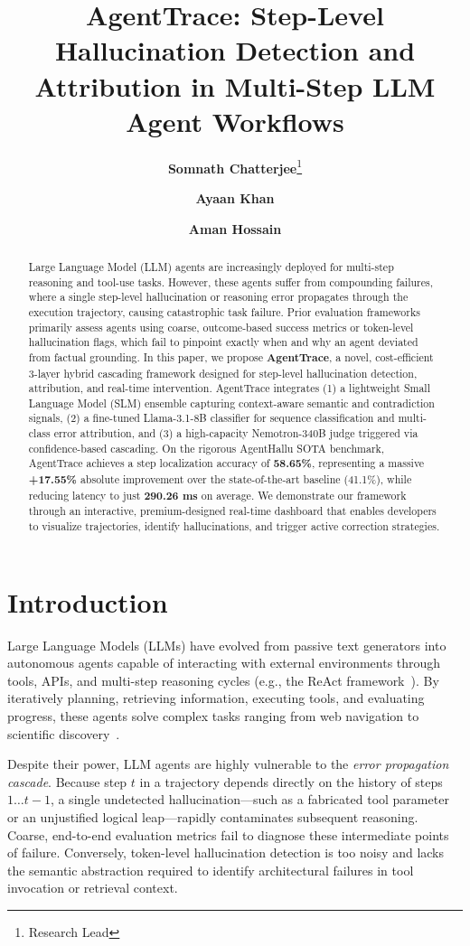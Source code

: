 \documentclass[11pt,a4paper]{article}
\title{\textbf{AgentTrace: Step-Level Hallucination Detection and Attribution in Multi-Step LLM Agent Workflows}}
\author[1]{\textbf{Somnath Chatterjee}\thanks{Research Lead}}
\author[1]{\textbf{Ayaan Khan}}
\author[1]{\textbf{Aman Hossain}}
\affil[1]{Department of Computer Science and Engineering}
\date{}
\begin{document}
\maketitle

\begin{abstract}
Large Language Model (LLM) agents are increasingly deployed for multi-step reasoning and tool-use tasks. However, these agents suffer from compounding failures, where a single step-level hallucination or reasoning error propagates through the execution trajectory, causing catastrophic task failure. Prior evaluation frameworks primarily assess agents using coarse, outcome-based success metrics or token-level hallucination flags, which fail to pinpoint exactly when and why an agent deviated from factual grounding. In this paper, we propose \textbf{AgentTrace}, a novel, cost-efficient 3-layer hybrid cascading framework designed for step-level hallucination detection, attribution, and real-time intervention. AgentTrace integrates (1) a lightweight Small Language Model (SLM) ensemble capturing context-aware semantic and contradiction signals, (2) a fine-tuned Llama-3.1-8B classifier for sequence classification and multi-class error attribution, and (3) a high-capacity Nemotron-340B judge triggered via confidence-based cascading. On the rigorous AgentHallu SOTA benchmark, AgentTrace achieves a step localization accuracy of \textbf{58.65\%}, representing a massive \textbf{+17.55\%} absolute improvement over the state-of-the-art baseline (41.1\%), while reducing latency to just \textbf{290.26 ms} on average. We demonstrate our framework through an interactive, premium-designed real-time dashboard that enables developers to visualize trajectories, identify hallucinations, and trigger active correction strategies.
\end{abstract}

\section{Introduction}
Large Language Models (LLMs) have evolved from passive text generators into autonomous agents capable of interacting with external environments through tools, APIs, and multi-step reasoning cycles (e.g., the ReAct framework~\cite{react2022}). By iteratively planning, retrieving information, executing tools, and evaluating progress, these agents solve complex tasks ranging from web navigation to scientific discovery~\cite{webarena2024, agentbench2024}. 

Despite their power, LLM agents are highly vulnerable to the \textit{error propagation cascade}. Because step $t$ in a trajectory depends directly on the history of steps $1 \dots t-1$, a single undetected hallucination—such as a fabricated tool parameter or an unjustified logical leap—rapidly contaminates subsequent reasoning. Coarse, end-to-end evaluation metrics fail to diagnose these intermediate points of failure. Conversely, token-level hallucination detection is too noisy and lacks the semantic abstraction required to identify architectural failures in tool invocation or retrieval context.
\end{document}

